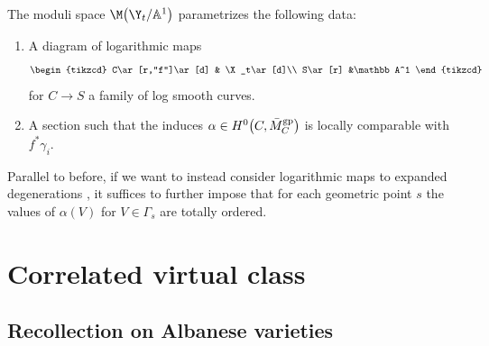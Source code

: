 \begin{coro}\label{prop:logmapsdegeneration}
 The moduli space $\M\bigl(\Y_t\slash\mathbb A^1\bigr)$ parametrizes the following data:
 \begin{enumerate}\itemsep=0pt
 \item[$(1)$] A diagram of logarithmic maps
 \[
 \begin{tikzcd}
 C\ar[r,"f"]\ar[d] & \X_t\ar[d]\\
 S\ar[r] &\mathbb A^1
 \end{tikzcd}
 \]
 for $C\to S$ a family of log smooth curves.
 \item[$(2)$] A section  such that the induces $\alpha\in H^0\bigl(C,\bar{M}_C^{\rm gp}\bigr)$ is locally comparable with $f^*\gamma_i$.
 \end{enumerate}
\end{coro}
\begin{remarkk}
 Parallel to before, if we want to instead consider logarithmic maps to expanded degenerations \cite{kim2010logarithmic,li2001stable,maulik2023logarithmic}, it suffices to further impose that for each geometric point $s$ the values of $\alpha(V)$ for $V\in\Gamma_s$ are totally ordered.
\end{remarkk}

\section{Correlated virtual class}

\subsection{Recollection on Albanese varieties}

